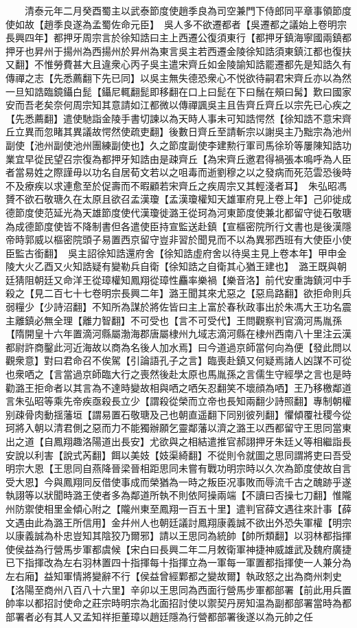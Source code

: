 　　清泰元年二月癸酉蜀主以武泰節度使趙季良為司空兼門下侍郎同平章事領節度使如故【趙季良遂為孟蜀佐命元臣】　吳人多不欲遷都者【吳遷都之議始上卷明宗長興四年】都押牙周宗言於徐知誥曰主上西遷公復須東行【都押牙鎮海寧國兩鎮都押牙也昇州于揚州為西揚州於昇州為東言吳主若西遷金陵徐知誥須東鎮江都也復扶又翻】不惟勞費甚大且違衆心丙子吳主遣宋齊丘如金陵諭知誥罷遷都先是知誥久有傳禪之志【先悉薦翻下先已同】以吳主無失德恐衆心不悦欲待嗣君宋齊丘亦以為然一旦知誥臨鏡鑷白髭【鑷尼輒翻髭即移翻在口上曰髭在下曰鬚在頰曰髯】歎曰國家安而吾老矣奈何周宗知其意請如江都微以傳禪諷吳主且告齊丘齊丘以宗先已心疾之【先悉薦翻】遣使馳詣金陵手書切諫以為天時人事未可知誥愕然【徐知誥不意宋齊丘立異而忽睹其異議故愕然使疏吏翻】後數日齊丘至請斬宗以謝吳主乃黜宗為池州副使【池州副使池州團練副使也】久之節度副使李建勲行軍司馬徐玠等屢陳知誥功業宜早從民望召宗復為都押牙知誥由是疎齊丘【為宋齊丘邀君得禍張本鳴呼為人臣者當易姓之際謹毋以功名自居荀文若以之咀毒而逝劉穆之以之發病而死范雲恐後時不及療疾以求連愈至於促壽而不暇顧若宋齊丘之疾周宗又其輕淺者耳】　朱弘昭馮贇不欲石敬瑭久在太原且欲召孟漢瓊【孟漢瓊權知天雄軍府見上卷上年】己卯徙成德節度使范延光為天雄節度使代漢瓊徙潞王從珂為河東節度使兼北都留守徙石敬瑭為成德節度使皆不降制書但各遣使臣持宣監送赴鎮【宣樞密院所行文書也是後漢隱帝時郭威以樞密院頭子易置西京留守豈非習於聞見而不以為異邪西班有大使臣小使臣監古銜翻】　吳主詔徐知誥還府舍【徐知誥虛府舍以待吳主見上卷本年】甲申金陵大火乙酉又火知誥疑有變勒兵自衛【徐知誥之自衛其心猶王建也】　潞王既與朝廷猜阻朝廷又命洋王從璋權知鳳翔從璋性麤率樂禍【樂音洛】前代安重誨鎮河中手殺之【見二百七十七卷明宗長興二年】潞王聞其來尤惡之【惡烏路翻】欲拒命則兵弱糧少【少詩沼翻】不知所為謀於將佐皆曰主上富於春秋政事出於朱馮大王功名震主離鎮必無全理【離力智翻】不可受也【言不可受代】王問觀察判官滴河馬胤孫【隋開皇十六年置滴河縣屬渤海郡唐屬棣州九域志滴河縣在棣州西南八十里注云漢都尉許商鑿此河近海故以商為名後人加水焉】曰今道過京師當何向為便【發此問以觀衆意】對曰君命召不俟駕【引論語孔子之言】臨喪赴鎮又何疑焉諸人凶謀不可從也衆哂之【言當過京師臨大行之喪然後赴太原也馬胤孫之言儒生守經學之言也是時勸潞王拒命者以其言為不達時變故相與哂之哂矢忍翻笑不壞顔為哂】王乃移檄鄰道言朱弘昭等乘先帝疾亟殺長立少【謂殺從榮而立帝也長知兩翻少詩照翻】專制朝權别疎骨肉動揺藩垣【謂易置石敬瑭及己也朝直遥翻下同别彼列翻】懼傾覆社稷今從珂將入朝以清君側之惡而力不能獨辦願乞靈鄰藩以濟之潞王以西都留守王思同當東出之道【自鳳翔趣洛陽道出長安】尤欲與之相結遣推官郝詡押牙朱廷乂等相繼詣長安說以利害【說式芮翻】餌以美妓【妓渠綺翻】不從則令就圖之思同謂將吏曰吾受明宗大恩【王思同自燕降晉梁晉相距思同未嘗有戰功明宗時以久次為節度使故自言受大恩】今與鳳翔同反借使事成而榮猶為一時之叛臣况事敗而辱流千古之醜跡乎遂執詡等以狀聞時潞王使者多為鄰道所執不則依阿操兩端【不讀曰否操七刀翻】惟隴州防禦使相里金傾心附之【隴州東至鳳翔一百五十里】遣判官薛文遇往來計事【薛文遇由此為潞王所信用】金幷州人也朝廷議討鳳翔康義誠不欲出外恐失軍權【明宗以康義誠為朴忠豈知其陰狡乃爾邪】請以王思同為統帥【帥所類翻】以羽林都指揮使侯益為行營馬步軍都虞候【宋白曰長興二年二月敇衛軍神捷神威雄武及魏府廣捷已下指揮改為左右羽林置四十指揮每十指揮立為一軍每一軍置都指揮使一人兼分為左右廂】益知軍情將變辭不行【侯益曾經鄴都之變故爾】執政怒之出為商州刺史【洛陽至商州八百八十六里】辛卯以王思同為西面行營馬步軍都部署【前此用兵置帥率以都招討使命之莊宗時明宗為北面招討使以禦契丹房知温為副都部署當時為都部署者必有其人又孟知祥拒董璋以趙廷隱為行營都部署後遂以為元帥之任